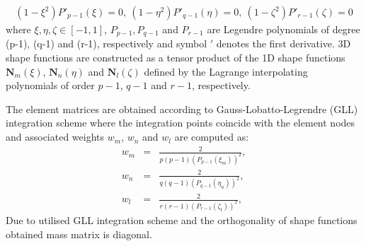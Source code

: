 \documentclass[a4paper,12pt]{article}
\begin{document}
\begin{eqnarray}
(1-\xi^2)P'_{p-1}(\xi)=0,\ (1-\eta^2)P'_{q-1}(\eta)=0,\ (1-\zeta^2)P'_{r-1}(\zeta)=0
	\label{eq:nodes}
\end{eqnarray} 
where $\xi,\eta,\zeta\in[-1,1]$, $P_{p-1},P_{q-1}$ and $P_{r-1}$ are Legendre polynomials of degree (p-1), (q-1) and (r-1), respectively and symbol $'$ denotes the first derivative. 3D shape functions are constructed as a tensor product of the 1D shape functions $\textbf{N}_m(\xi)$, $\textbf{N}_n(\eta)$ and $\textbf{N}_l(\zeta)$ defined by the Lagrange interpolating polynomials of order $p-1$, $q-1$ and $r-1$, respectively.

The element matrices are obtained according to Gauss-Lobatto-Legrendre (GLL) integration scheme where the integration points coincide with the element nodes and associated weights ${w}_m$, ${w}_n$ and ${w}_l$ are computed as:
\begin{eqnarray}
{w}_m &=& \frac{2}{p(p-1)(P_{p-1}(\xi_m))^2},\nonumber\\
{w}_n &=& \frac{2}{q(q-1)(P_{q-1}(\eta_n))^2},\nonumber \\
{w}_l &=& \frac{2}{r(r-1)(P_{r-1}(\zeta_l))^2},
\label{eq:weights}
\end{eqnarray}
Due to utilised GLL integration scheme and the orthogonality of shape functions obtained mass matrix is diagonal.
\end{document}
